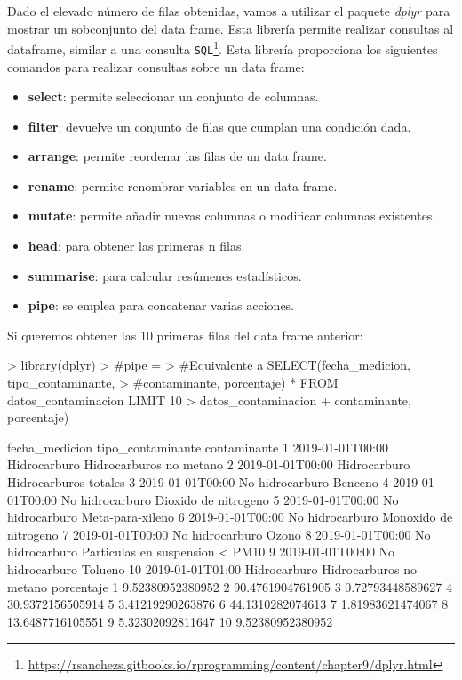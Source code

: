 \documentclass [a4paper] {article}
\begin{document}
Dado el elevado número de filas obtenidas, vamos a utilizar el paquete \textit{dplyr} para mostrar un sobconjunto del data frame. Esta librería permite realizar consultas al dataframe,
similar a una consulta \texttt{SQL}\footnote{\url{https://rsanchezs.gitbooks.io/rprogramming/content/chapter9/dplyr.html}}. Esta librería proporciona los siguientes comandos para realizar
consultas sobre un data frame:
\begin{itemize}
	\item \textbf{select}: permite seleccionar un conjunto de columnas.
	\item \textbf{filter}: devuelve un conjunto de filas que cumplan una condición dada.
	\item \textbf{arrange}: permite reordenar las filas de un data frame.
	\item \textbf{rename}: permite renombrar variables en un data frame.
	\item \textbf{mutate}: permite añadir nuevas columnas o modificar columnas existentes.
	\item \textbf{head}: para obtener las primeras n filas.
	\item \textbf{summarise}: para calcular resúmenes estadísticos.
    \item \textbf{pipe}: se emplea para concatenar varias acciones.
\end{itemize}
\newpage
Si queremos obtener las 10 primeras filas del data frame anterior:
\begin{Schunk}
\begin{Sinput}
> library(dplyr)
> #pipe = %>%
> #Equivalente a SELECT(fecha_medicion, tipo_contaminante, 
> #contaminante, porcentaje) * FROM datos_contaminacion LIMIT 10
> datos_contaminacion %>% select(fecha_medicion, tipo_contaminante, 
+ contaminante, porcentaje) %>% head(10)
\end{Sinput}
\begin{Soutput}
     fecha_medicion tipo_contaminante                     contaminante
1  2019-01-01T00:00      Hidrocarburo          Hidrocarburos no metano
2  2019-01-01T00:00      Hidrocarburo            Hidrocarburos totales
3  2019-01-01T00:00   No hidrocarburo                          Benceno
4  2019-01-01T00:00   No hidrocarburo             Dioxido de nitrogeno
5  2019-01-01T00:00   No hidrocarburo                 Meta-para-xileno
6  2019-01-01T00:00   No hidrocarburo            Monoxido de nitrogeno
7  2019-01-01T00:00   No hidrocarburo                            Ozono
8  2019-01-01T00:00   No hidrocarburo Parti­culas en suspension < PM10
9  2019-01-01T00:00   No hidrocarburo                          Tolueno
10 2019-01-01T01:00      Hidrocarburo          Hidrocarburos no metano
         porcentaje
1  9.52380952380952
2  90.4761904761905
3  0.72793448589627
4  30.9372156505914
5  3.41219290263876
6  44.1310282074613
7  1.81983621474067
8  13.6487716105551
9  5.32302092811647
10 9.52380952380952
\end{Soutput}
\end{Schunk}
\end{document}
